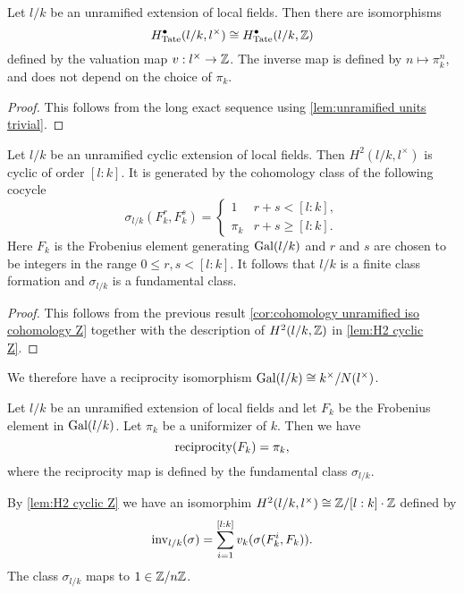 \begin{corollary} \label{cor:cohomology unramified iso cohomology Z}
	Let $l/k$ be an unramified extension of local fields.
	Then there are isomorphisms
	\[
		H^\bullet_{\mathrm{Tate}}(l/k,l^\times) \cong H^\bullet_{\mathrm{Tate}} (l/k,{\mathbb Z})
	\]
	defined by the valuation map $v : l^\times \to {\mathbb Z}$.
	The inverse map is defined by $n \mapsto \pi_k^n$, and does not depend on the choice of $\pi_k$.
\end{corollary}

\begin{proof}
	This follows from the long exact sequence using \ref{lem:unramified units trivial}.
\end{proof}


\begin{lemma} \label{lem:unramified fundamental class}
	Let $l/k$ be an unramified cyclic extension of local fields.
	Then $H^2(l/k,l^\times)$ is cyclic of order $[l:k]$.
	It is generated by the cohomology class of the following cocycle
	\[
		\sigma_{l/k} (F_k^r, F_k^s) =
		\begin{cases}
			1 & r + s < [l:k], \\
			\pi_k & r + s \ge [l:k].
		\end{cases}
	\]
	Here $F_k$ is the Frobenius element generating $\mathrm{Gal}(l/k)$ and $r$ and $s$
	are chosen to be integers in the range $0 \le r,s <[l:k]$.
	It follows that $l / k$ is a finite class formation and $\sigma_{l/k}$ is a fundamental class.
\end{lemma}

\begin{proof}
	This follows from the previous result \ref{cor:cohomology unramified iso cohomology Z}
	together with the description of $H^2(l/k,{\mathbb Z})$ in \ref{lem:H2 cyclic Z}.
\end{proof}


We therefore have a reciprocity isomorphism $\mathrm{Gal}(l/k) \cong k^\times / N(l^\times)$.

\begin{lemma} \label{lem:local unramified reciprocity}
	Let $l/k$ be an unramified extension of local fields and let $F_k$ be the Frobenius
	element in $\mathrm{Gal}(l/k)$. Let $\pi_k$ be a uniformizer of $k$. Then we have
	\[
		\mathrm{reciprocity} (F_k)= \pi_k,
	\]
	where the reciprocity map is defined by the fundamental class $\sigma_{l/k}$.
\end{lemma}

By \ref{lem:H2 cyclic Z} we have an isomorphim $H^2(l/k, l^\times) \cong {\mathbb Z} / [l:k]\cdot {\mathbb Z}$
defined by
\[
	\mathrm{inv}_{l/k}(\sigma) = \sum_{i=1}^{[l:k]} v_k(\sigma(F_k^i, F_k)).
\]
The class $\sigma_{l/k}$ maps to $1 \in {\mathbb Z}/n{\mathbb Z}$.







